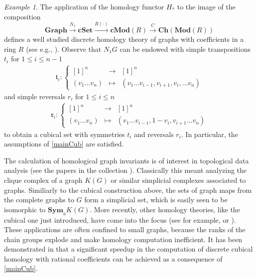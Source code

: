 \documentclass[12pt]{amsart}
\theoremstyle{plain}
\numberwithin{lemma}{\DefaultNumberTheoremWithin}
\numberwithin{claim}{\DefaultNumberTheoremWithin}
\numberwithin{theorem}{\DefaultNumberTheoremWithin}
\numberwithin{corollary}{\DefaultNumberTheoremWithin}
\numberwithin{proposition}{\DefaultNumberTheoremWithin}
\numberwithin{conjecture}{\DefaultNumberTheoremWithin}
\theoremstyle{definition}
\theoremstyle{definition}
\numberwithin{question}{\DefaultNumberTheoremWithin}
\theoremstyle{definition}
\numberwithin{problem}{\DefaultNumberTheoremWithin}
\theoremstyle{remark}
\numberwithin{remark}{\DefaultNumberTheoremWithin}
\theoremstyle{remark}
\newtheorem{example}{Example}
\numberwithin{example}{\DefaultNumberTheoremWithin}
\def\one{[1]}
\def \la{\longrightarrow}
\def \lm{\longmapsto}
\def\ft{\mathfrak{t}}
\def\fr{\mathfrak{r}}
\begin{document}
\begin{example}
 The application of the homology
functor $H_*$ to the image of the composition 
\[
\mathbf{Graph}\overset{N_1}{\la} \mathbf{cSet}\overset{R(\cdot)}{\la} \mathbf{cMod}(R)\overset{C}{\la} \mathbf{Ch}(\mathbf{Mod}(R))
\]
defines a well studied discrete homology theory of graphs with coefficients in a ring $R$ (see e.g., \cite{DiscreteHomology,ComparisonWithPath}). Observe that $N_1G$ can be endowed with 
simple transpositions $t_i$ for $1\leq i \leq n-1$ 
    \begin{align*}
        \ft_i\colon \left\{ \begin{array}{ccc} \one^n&\la& \one^n  \\
        (v_1\dots v_{n})&\lm &(v_1\dots v_{i-1},v_{i+1},v_{i},\dots v_{n})\end{array} \right.
    \end{align*}
    and simple reversals $r_i$ for $1\leq i \leq n$
    \begin{align*}
        \fr_i\colon \left\{ \begin{array}{ccc} \one^n & \la & \one^n\\
        (v_1\dots v_{n})&\lm & (v_1\dots v_{i-1},1-v_{i},v_{i+1}\dots v_{n}) \end{array} \right.
    \end{align*}
to obtain a cubical set with symmetries $t_i$  and reversals $r_i$. In particular, the assumptions of
\ref{mainCub} are satisfied.
 
The calculation of 
homological graph invariants is of interest in 
topological data analysis (see the papers in the collection \cite{CS24}). Classically
this meant analyzing the clique complex of a graph $K(G)$ or similar simplicial complexes associated to graphs. Similiarly to the cubical construction above, the sets of graph maps from the complete graphs to $G$ form a simplicial set, which is easily seen to be isomorphic to $\mathbf{Sym}_aK(G)$. More recently, other homology theories, like the cubical one just introduced,
have come into the focus (see for example\cite{NathanChrisTDA}, \cite{CS24} or
\cite{CM18}).
These applications are often confined to small
graphs,  because the ranks of the chain groups explode and make homology computation inefficient. 
It has been demonstrated in \cite{NathanAndChris} that a significant speedup in the computation of discrete cubical homology with rational coefficients can be achieved as a consequence of \ref{mainCub}.
\end{example}
\end{document}

